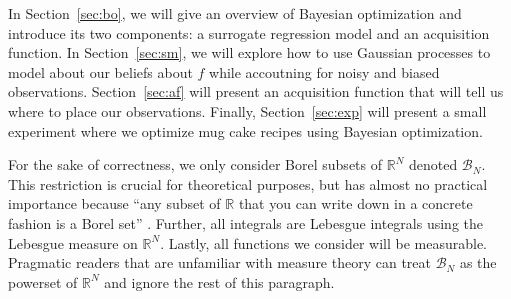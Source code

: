 In Section~\ref{sec:bo}, we will give an overview of Bayesian optimization and introduce its two components: a surrogate regression model and an acquisition function.
In Section~\ref{sec:sm}, we will explore how to use Gaussian processes
to model about our beliefs about $f$ while accoutning for noisy and biased observations.
Section~\ref{sec:af} will present an acquisition function that will tell us where to place our observations.
Finally, Section~\ref{sec:exp} will present a small experiment where we optimize mug cake recipes using Bayesian optimization.

For the sake of correctness, we only consider Borel subsets of $\mathbb{R}^{N}$ denoted $\mathcal{B}_N$.
This restriction is crucial for theoretical purposes, but has almost no practical importance because
 ``any subset of $\mathbb{R}$ that you can write down in a concrete fashion is a Borel set'' \cite{axler2020}.
Further, all integrals are Lebesgue integrals using the Lebesgue measure on $\mathbb{R}^{N}$.
Lastly, all functions we consider will be measurable.
Pragmatic readers that are unfamiliar with measure theory can treat $\mathcal{B}_N$ as the powerset of $\mathbb{R}^{N}$ and ignore the rest of this paragraph.
